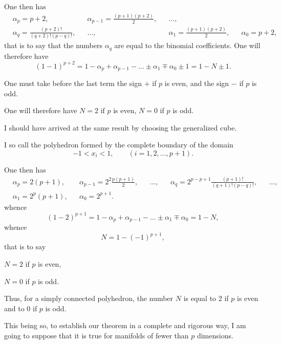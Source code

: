 \documentclass{article}
\begin{document}
One then has
\[ \begin{aligned} &\alpha_{p} = p + 2, &&\alpha_{p-1} = \frac{(p + 1)(p + 2)}{2}, &&\ldots,\\ &\alpha_{q} = \frac{(p + 2)!}{(q + 2)!(p - q)!}, &&\ldots, &&\alpha_{1} = \frac{(p + 1)(p + 2)}{2}, &&\alpha_{0} = p + 2, \end{aligned} \]
that is to say that the numbers $\alpha_{q}$ are equal to the binomial coefficients.
One will therefore have
\[ (1 - 1)^{p+2} = 1 - \alpha_{p} + \alpha_{p-1} - \ldots \pm \alpha_{1} \mp \alpha_{0} \pm 1 = 1 - N \pm 1. \]

One must take before the last term the sign $+$ if $p$ is even, and the sign $-$ if $p$ is odd.

One will therefore have $N = 2$ if $p$ is even, $N = 0$ if $p$ is odd.

I should have arrived at the same result by choosing the generalized cube.

I so call the polyhedron formed by the complete boundary of the domain
\[ -1 < x_{i} < 1, \qquad (i = 1, 2, \ldots, p + 1). \]

One then has
\[ \begin{aligned} &\alpha_{p} = 2(p + 1), &&\alpha_{p-1} = 2^{2}\frac{p(p + 1)}{2}, &&\ldots, &&\alpha_{q} = 2^{p-p+1}\frac{(p + 1)!}{(q + 1)!(p - q)!}, &&\ldots,\\ &\alpha_{1} = 2^{p}(p + 1), &&\alpha_{0} = 2^{p+1}. \end{aligned} \]
whence
\[ (1 - 2)^{p+1} = 1 - \alpha_{p} + \alpha_{p-1} - \ldots \pm \alpha_{1} \mp \alpha_{0} = 1 - N, \]
whence
\[ N = 1 - (-1)^{p+1}, \]
that is to say

$N = 2$ if $p$ is even,

$N = 0$ if $p$ is odd.

Thus, for a simply connected polyhedron, the number $N$ is equal to 2 if $p$ is even and to 0 if $p$ is odd.

This being so, to establish our theorem in a complete and rigorous way, I am going to suppose that it is true for manifolds of fewer than $p$ dimensions.
\end{document}
